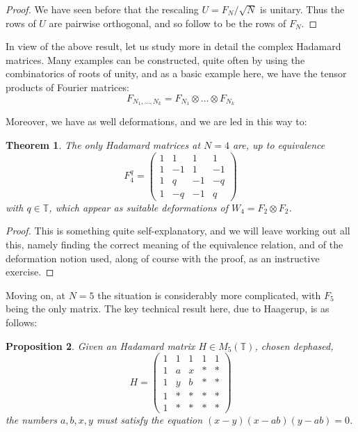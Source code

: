\documentclass[12pt]{amsbook}
\newtheorem{theorem}{Theorem}[chapter]
\newtheorem{proposition}[theorem]{Proposition}
\begin{document}
\begin{proof}
We have seen before that the rescaling $U=F_N/\sqrt{N}$ is unitary. Thus the rows of $U$ are pairwise orthogonal, and so follow to be the rows of $F_N$.
\end{proof}

In view of the above result, let us study more in detail the complex Hadamard matrices. Many examples can be constructed, quite often by using the combinatorics of roots of unity, and as a basic example here, we have the tensor products of Fourier matrices:
$$F_{N_1,\ldots,N_k}=F_{N_1}\otimes\ldots\otimes F_{N_k}$$ 

Moreover, we have as well deformations, and we are led in this way to:

\begin{theorem}
The only Hadamard matrices at $N=4$ are, up to equivalence
$$F_4^q=\begin{pmatrix}
1&1&1&1\\
1&-1&1&-1\\
1&q&-1&-q\\ 
1&-q&-1&q
\end{pmatrix}$$
with $q\in\mathbb T$, which appear as suitable deformations of $W_4=F_2\otimes F_2$.
\end{theorem}

\begin{proof}
This is something quite self-explanatory, and we will leave working out all this, namely finding the correct meaning of the equivalence relation, and of the deformation notion used, along of course with the proof, as an instructive exercise.
\end{proof}

Moving on, at $N=5$ the situation is considerably more complicated, with $F_5$ being the only matrix. The key technical result here, due to Haagerup, is as follows:

\begin{proposition}
Given an Hadamard matrix $H\in M_5(\mathbb T)$, chosen dephased,
$$H=\begin{pmatrix}
1&1&1&1&1\\
1&a&x&*&*\\
1&y&b&*&*\\
1&*&*&*&*\\
1&*&*&*&*
\end{pmatrix}$$
the numbers $a,b,x,y$ must satisfy the equation $(x-y)(x-ab)(y-ab)=0$.
\end{proposition}
\end{document}
